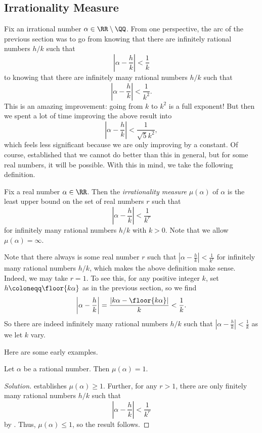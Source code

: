\documentclass[../notes.tex]{subfiles}
\begin{document}
\subsection{Irrationality Measure}
Fix an irrational number $\alpha\in\RR\setminus\QQ$. From one perspective, the arc of the previous section was to go from knowing that there are infinitely rational numbers $h/k$ such that
\[\left|\alpha-\frac hk\right|<\frac1k\]
to knowing that there are infinitely many rational numbers $h/k$ such that
\[\left|\alpha-\frac hk\right|<\frac1{k^2}.\]
This is an amazing improvement: going from $k$ to $k^2$ is a full exponent! But then we spent a lot of time improving the above result into
\[\left|\alpha-\frac hk\right|<\frac1{\sqrt 5k^2},\]
which feels less significant because we are only improving by a constant. Of course,  established that we cannot do better than this in general, but for some real numbers, it will be possible. With this in mind, we take the following definition.
\begin{definition}
	Fix a real number $\alpha\in\RR$. Then the \textit{irrationality measure} $\mu(\alpha)$ of $\alpha$ is the least upper bound on the set of real numbers $r$ such that
	\[\left|\alpha-\frac hk\right|<\frac1{k^r}\]
	for infinitely many rational numbers $h/k$ with $k>0$. Note that we allow $\mu(\alpha)=\infty$.
\end{definition}
\begin{remark} \label{rem:mu-alpha-at-least-1}
	Note that there always is some real number $r$ such that $\left|\alpha-\frac hk\right|<\frac1{k^r}$ for infinitely many rational numbers $h/k$, which makes the above definition make sense. Indeed, we may take $r=1$. To see this, for any positive integer $k$, set $h\coloneqq\floor{k\alpha}$ as in the previous section, so we find
	\[\left|\alpha-\frac hk\right|=\frac{\left|k\alpha-\floor{k\alpha}\right|}{k}<\frac1k.\]
	So there are indeed infinitely many rational numbers $h/k$ such that $\left|\alpha-\frac hk\right|<\frac1k$ as we let $k$ vary.
\end{remark}
Here are some early examples.
\begin{example} \label{ex:mu-rat-one}
	Let $\alpha$ be a rational number. Then $\mu(\alpha)=1$.
\end{example}
\begin{proof}[Solution]
	 establishes $\mu(\alpha)\ge1$. Further, for any $r>1$, there are only finitely many rational numbers $h/k$ such that
	\[\left|\alpha-\frac hk\right|<\frac1{k^r}\]
	by . Thus, $\mu(\alpha)\le1$, so the result follows.
\end{proof}
\end{document}
